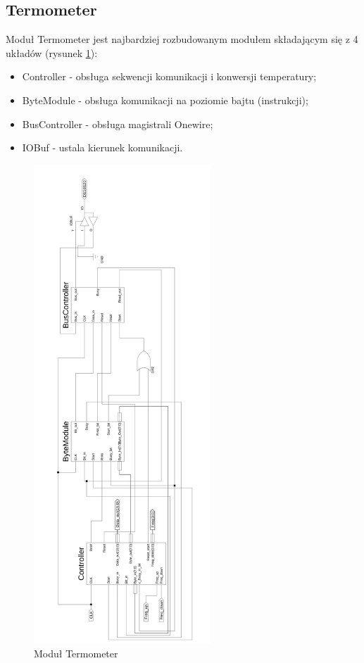 \documentclass[a4paper]{article}
\begin{document}
\subsection{Termometer}
Moduł Termometer jest najbardziej rozbudowanym modułem składającym się z 4 układów (rysunek \ref{termometer}):
\begin{itemize}
\item Controller - obsługa sekwencji komunikacji i konwersji temperatury;
\item ByteModule - obsługa komunikacji na poziomie bajtu (instrukcji);
\item BusController - obsługa magistrali Onewire;
\item IOBuf - ustala kierunek komunikacji.
\end{itemize}

\begin{figure}[H]
\begin{center}
\includegraphics[height=18cm]{graphics/termometer.png}
\end{center}
\caption{Moduł Termometer}
\label{termometer}
\end{figure}
\end{document}
